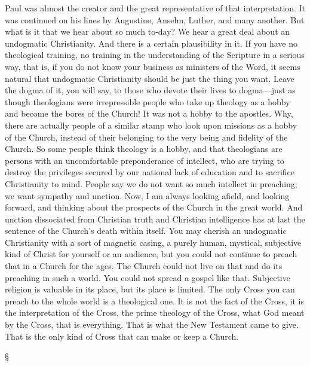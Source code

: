 \documentclass[12pt,a5paper,twoside,titlepage]{book}
\begin{document}
Paul was almost the creator and the great 
representative of that interpretation. It was 
continued on his lines by Augustine, Anselm, 
Luther, and many another. But what is it 
that we hear about so much to-day? We 
hear a great deal about an undogmatic Christianity. 
And there is a certain plausibility in 
it. If you have no theological training, no 
training in the understanding of the Scripture 
in a serious way, that is, if you do not know 
your business as ministers of the Word, it seems 
natural that undogmatic Christianity should be 
just the thing you want. Leave the dogma 
of it, you will say, to those who devote their 
lives to dogma---just as though theologians were 
irrepressible people who take up theology as a 
hobby and become the bores of the Church! 
It was not a hobby to the apostles. Why, 
there are actually people of a similar stamp 
who look upon missions as a hobby of the 
Church, instead of their belonging to the 
very being and fidelity of the Church. So 
some people think theology is a hobby, and 
that theologians are persons with an uncomfortable 
preponderance of intellect, who are 
trying to destroy the privileges secured by 
our national lack of education and to sacrifice 
Christianity to mind. People say we do not 
want so much intellect in preaching; we want 
sympathy and unction. Now, I am always looking 
afield, and looking forward, and thinking 
about the prospects of the Church in the great 
world. And unction dissociated from Christian 
truth and Christian intelligence has at last the 
sentence of the Church's death within itself. 
You may cherish an undogmatic Christianity 
with a sort of magnetic casing, a purely human, 
mystical, subjective kind of Christ for yourself 
or an audience, but you could not continue to 
preach that in a Church for the ages. The 
Church could not live on that and do its 
preaching in such a world. You could not 
spread a gospel like that. Subjective religion 
is valuable in its place, but its place is limited. 
The only Cross you can preach to the whole 
world is a theological one. It is not the fact 
of the Cross, it is the interpretation of the 
Cross, the prime theology of the Cross, what 
God meant by the Cross, that is everything. 
That is what the New Testament came to 
give. That is the only kind of Cross that 
can make or keep a Church.

\begin{center}
\S
\end{center} 
\end{document}
